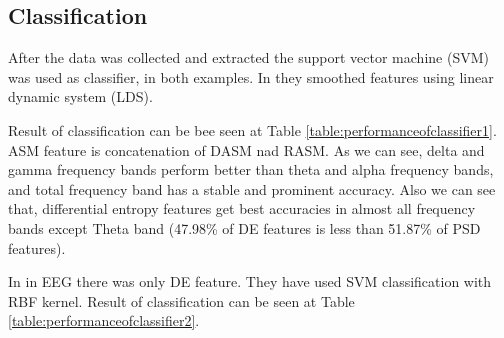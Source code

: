 \documentclass[10pt,journal,compsoc,twoside]{IEEEtran}
\newcommand{\Ref}[2]{#2 \ref{#1}}
\begin{document}
\subsection{Classification}
After the data was collected and extracted the support vector machine (SVM) was used as classifier, in both examples.
In  \cite{WeiLongBoNanBaoLiang2014} they smoothed features using linear dynamic system (LDS).
\begin{table}[ht]
	\centering %
	\caption{The performance of classifiers in \% using different kinds of frequency band features. For \cite{WeiLongBoNanBaoLiang2014}.}
	\label{table:performanceofclassifier1}
\end{table}
Result of classification can be bee seen at \Ref{table:performanceofclassifier1}{Table}. ASM feature is concatenation of DASM nad RASM. As we can see, delta and gamma frequency bands perform better than theta and alpha frequency bands, and total frequency band has a stable and  prominent  accuracy.  Also  we  can  see  that,  differential entropy features get best accuracies in almost all frequency  bands  except  Theta  band  (47.98\%  of  DE  features is  less  than  51.87\%  of  PSD  features).
\newline
\par In \cite{SoleymaniPanticPun2002} in EEG there was only DE feature. They have used SVM classification with RBF kernel. Result of classification can be seen at \Ref{table:performanceofclassifier2}{Table}.
\end{document}
